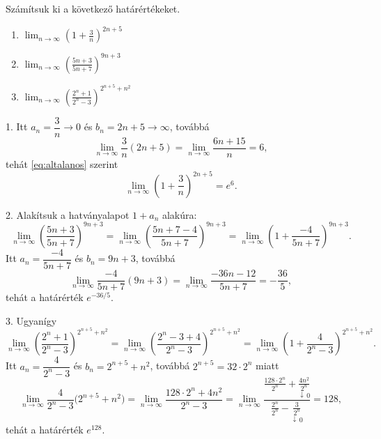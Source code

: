 \documentclass[11pt]{article}
\begin{document}
\begin{exbox}
\begin{example}
Számítsuk ki a következő határértékeket.
\begin{enumerate}[label=\arabic*., itemsep=6pt]
\item $\displaystyle\lim_{n\to\infty}\left(1+\frac{3}{n}\right)^{2n+5}$
\item $\displaystyle\lim_{n\to\infty}\left(\frac{5n+3}{5n+7}\right)^{9n+3}$
\item $\displaystyle\lim_{n\to\infty}\left(\frac{2^{n}+1}{2^{n}-3}\right)^{2^{n+5}+n^{2}}$
\end{enumerate}
\end{example}
\end{exbox}
\begin{solution}
1. Itt $a_{n}=\dfrac{3}{n}\to 0$ és $b_{n}=2n+5\to\infty$, továbbá
\[
\lim_{n\to\infty}\frac{3}{n}(2n+5)=\lim_{n\to\infty}\frac{6n+15}{n}=6,
\]
tehát \eqref{eq:altalanos} szerint
\[
\lim_{n\to\infty}\left(1+\frac{3}{n}\right)^{2n+5}=e^{6}.
\]

2. Alakítsuk a hatványalapot $1+a_{n}$ alakúra:
\[
\lim_{n\to\infty}\left(\frac{5n+3}{5n+7}\right)^{9n+3}
=\lim_{n\to\infty}\left(\frac{5n+7-4}{5n+7}\right)^{9n+3}
=\lim_{n\to\infty}\left(1+\frac{-4}{5n+7}\right)^{9n+3}.
\]
Itt $a_{n}=\dfrac{-4}{5n+7}$ és $b_{n}=9n+3$, továbbá
\[
\lim_{n\to\infty}\frac{-4}{5n+7}(9n+3)=\lim_{n\to\infty}\frac{-36n-12}{5n+7}=-\frac{36}{5},
\]
tehát a határérték $e^{-36/5}$.

3. Ugyanígy
\[
\lim_{n\to\infty}\left(\frac{2^{n}+1}{2^{n}-3}\right)^{2^{n+5}+n^{2}}
=\lim_{n\to\infty}\left(\frac{2^{n}-3+4}{2^{n}-3}\right)^{2^{n+5}+n^{2}}
=\lim_{n\to\infty}\left(1+\frac{4}{2^{n}-3}\right)^{2^{n+5}+n^{2}}.
\]
Itt $a_{n}=\dfrac{4}{2^{n}-3}$ és $b_{n}=2^{n+5}+n^{2}$, továbbá $2^{n+5}=32\cdot 2^{n}$ miatt
\[
\lim_{n\to\infty}\frac{4}{2^{n}-3}\bigl(2^{n+5}+n^{2}\bigr)
=\lim_{n\to\infty}\frac{128\cdot 2^{n}+4n^{2}}{2^{n}-3}
=\lim_{n\to\infty}\frac{\frac{128\cdot 2^{n}}{2^{n}}+\underset{\downarrow\,0}{\frac{4n^{2}}{2^{n}}}}
{\frac{2^{n}}{2^{n}}-\underset{\downarrow\,0}{\frac{3}{2^{n}}}}=128,
\]
tehát a határérték $e^{128}$.
\end{solution}
\end{document}
